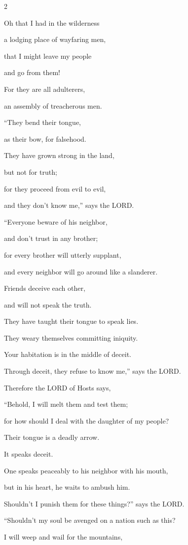 \begin{multicols}{2}
	
	\myverse{}Oh that I had in the wilderness
	
	a lodging place of wayfaring men,
	
	that I might leave my people
	
	and go from them!
	
	For they are all adulterers,
	
	an assembly of treacherous men.
	
	
	\myverse{}“They bend their tongue,
	
	as their bow, for falsehood.
	
	They have grown strong in the land,
	
	but not for truth;
	
	for they proceed from evil to evil,
	
	and they don’t know me,” says the LORD.
	
	
	\myverse{}“Everyone beware of his neighbor,
	
	and don’t trust in any brother;
	
	for every brother will utterly supplant,
	
	and every neighbor will go around like a slanderer.
	
	
	\myverse{}Friends deceive each other,
	
	and will not speak the truth.
	
	They have taught their tongue to speak lies.
	
	They weary themselves committing iniquity.
	
	
	\myverse{}Your habitation is in the middle of deceit.
	
	Through deceit, they refuse to know me,” says the LORD.
	
	
	\myverse{}Therefore the LORD of Hosts says,
	
	“Behold, I will melt them and test them;
	
	for how should I deal with the daughter of my people?
	
	
	\myverse{}Their tongue is a deadly arrow.
	
	It speaks deceit.
	
	One speaks peaceably to his neighbor with his mouth,
	
	but in his heart, he waits to ambush him.
	
	
	\myverse{}Shouldn’t I punish them for these things?” says the LORD.
	
	“Shouldn’t my soul be avenged on a nation such as this?
	
	
	\myverse{}I will weep and wail for the mountains,
	

\end{multicols}
